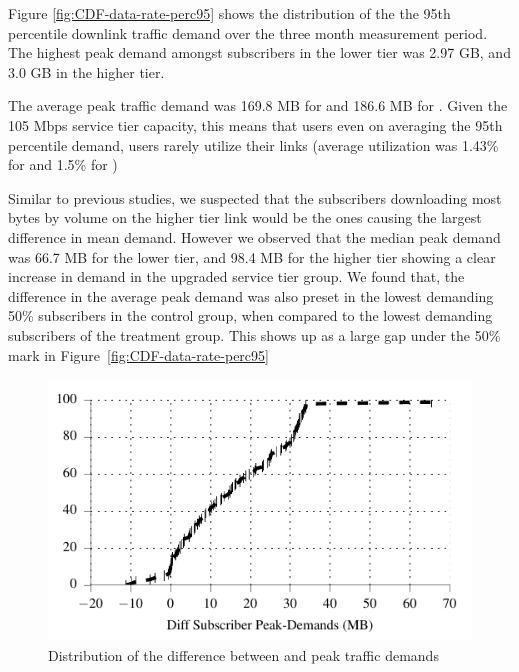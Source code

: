 Figure \ref{fig:CDF-data-rate-perc95} shows the distribution of the
the 95th percentile downlink traffic demand 
over the three month measurement period. The highest peak
demand amongst subscribers in the lower tier was 2.97 GB,
and 3.0 GB in the higher tier.

The average peak traffic demand was 169.8 MB for \control{} and
186.6 MB for \treatment{}. Given the 105 Mbps service tier capacity,
this means that users even on averaging the 95th percentile demand,
users rarely utilize their links (average utilization was 1.43\%
for \control{} and 1.5\% for \treatment{})

Similar to previous studies, we suspected that the subscribers downloading most bytes
by volume on the higher tier link would be the ones causing the largest difference
in mean demand. However we observed that the median peak demand 
was 66.7 MB for the lower tier, and 98.4 MB for the higher tier
showing a clear increase in demand in the upgraded service tier
group. We found that, the difference in the average peak demand
was also preset in the lowest demanding 50\% subscribers
in the control group, when compared to the lowest demanding subscribers of the treatment
group. This shows up as a large gap under the 50\% mark in Figure~\ref{fig:CDF-data-rate-perc95}


\begin{figure}[t]
\centering
\includegraphics[width=\linewidth]{figures/cdf_diff_perc95_bytes_subsc-overall.pdf}
               \caption{Distribution of the difference between \treatment{} and \control{}
               peak traffic demands\label{fig:cdf-diff-perc95}}
\end{figure}


